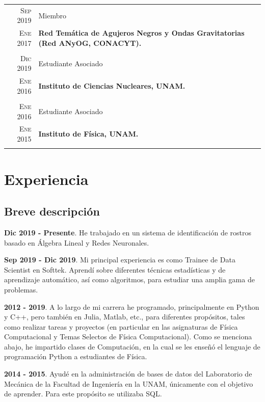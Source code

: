 \documentclass[a4paper,10pt]{article} %
\begin{document}
\begin{tabular}{r|l}
	\textsc{Sep 2019}& Miembro\\
	\textsc{Ene 2017}&\footnotesize{\textbf{Red Temática de Agujeros Negros y Ondas Gravitatorias (Red ANyOG, CONACYT).}}\\
	\multicolumn{2}{c}{} \\
	\textsc{Dic 2019}& Estudiante Asociado\\
	\textsc{Ene 2016}&\footnotesize{\textbf{Instituto de Ciencias Nucleares, UNAM.}}\\
	\multicolumn{2}{c}{} \\
	\textsc{Ene 2016} & Estudiante Asociado\\
	\textsc{Ene 2015}&\footnotesize{\textbf{Instituto de Física, UNAM.}}\\
	\multicolumn{2}{c}{} \\
\end{tabular}


\section{Experiencia}
\bigskip

\subsection{Breve descripción}
\textbf{Dic 2019 - Presente}. He trabajado en un sistema de identificación de rostros basado en Álgebra Lineal y Redes Neuronales.

\textbf{Sep 2019 - Dic 2019}. Mi principal experiencia es como Trainee de Data Scientist en Softtek. Aprendí sobre diferentes técnicas estadísticas y de aprendizaje automático, así como algoritmos, para estudiar una amplia gama de problemas.

\textbf{2012 - 2019}. A lo largo de mi carrera he programado, principalmente en Python y C++, pero también en Julia, Matlab, etc., para diferentes propósitos, tales como realizar tareas y proyectos (en particular en las asignaturas de Física Computacional y Temas Selectos de Física Computacional). Como se menciona abajo, he impartido clases de Computación, en la cual se les enseñó el lenguaje de programación Python a estudiantes de Física. 

\textbf{2014 - 2015}. Ayudé en la administración de bases de datos del Laboratorio de Mecánica de la Facultad de Ingeniería en la UNAM, únicamente con el objetivo de aprender. Para este propósito se utilizaba SQL.
\end{document}
